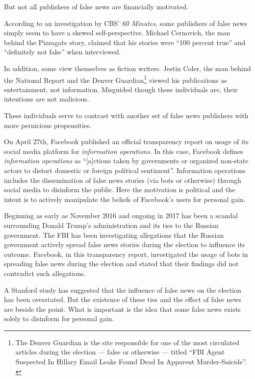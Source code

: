 \par But not all publishers of false news are financially motivated.
\par According to an investigation by CBS' \emph{60 Minutes}, some publishers of false news simply seem to have a skewed self-perspective. Michael Cernovich, the man behind the Pizzagate story, claimed that his stories were ``100 percent true'' and ``definitely not fake'' when interviewed. \cite{cbs_fn}
\par In addition, some view themselves as fiction writers. Jestin Coler, the man behind the National Report and the Denver Guardian\footnote{The Denver Guardian is the site responsible for one of the most circulated articles during the election --- false or otherwise --- titled ``FBI Agent Suspected In Hillary Email Leaks Found Dead In Apparent Murder-Suicide''. \cite{cbs_fn}} viewed his publications as entertainment, not information. \cite{cbs_fn} Misguided though these individuals are, their intentions are not malicious.
\par These individuals serve to contrast with another set of false news publishers with more pernicious propensities.

\label{info_ops}

\par On April 27th, Facebook published an official transparency report on usage of its social media platform for \emph{information operations}. In this case, Facebook defines \emph{information operations} as ``[a]ctions taken by governments or organized non-state actors to distort domestic or foreign political sentiment''. \cite{fb_info_ops} Information operations includes the dissemination of false news stories (via bots or otherwise) through social media to disinform the public. Here the motivation is political and the intent is to actively manipulate the beliefs of Facebook's users for personal gain.
\par Beginning as early as November 2016 and ongoing in 2017 has been a scandal surrounding Donald Trump's administration and its ties to the Russian government. \cite{wp_russia} The FBI has been investigating allegations that the Russian government actively spread false news stories during the election to influence its outcome. Facebook, in this transparency report, investigated the usage of bots in spreading false news during the election and stated that their findings did not contradict such allegations. \cite{fb_info_ops}
\par A Stanford study has suggested that the influence of false news on the election has been overstated. \cite{stanford_study} But the existence of these ties and the effect of false news are beside the point. What is important is the idea that some false news exists solely to disinform for personal gain.

